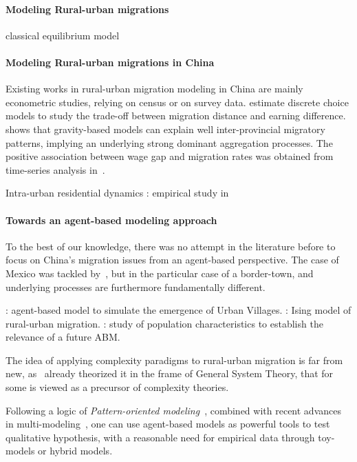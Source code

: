 \paragraph{Modeling Rural-urban migrations}

\cite{todaro1969model} classical equilibrium model


\paragraph{Modeling Rural-urban migrations in China}

Existing works in rural-urban migration modeling in China are mainly econometric studies, relying on census or on survey data. \cite{zhang2013measuring} estimate discrete choice models to study the trade-off between migration distance and earning difference. \cite{fan2005modeling} shows that gravity-based models can explain well inter-provincial migratory patterns, implying an underlying strong dominant aggregation processes. The positive association between wage gap and migration rates was obtained from time-series analysis in~\cite{zhang2003rural}.

Intra-urban residential dynamics : empirical study in \cite{wu2006migrant} 

\paragraph{Towards an agent-based modeling approach}

To the best of our knowledge, there was no attempt in the literature before to focus on China's migration issues from an agent-based perspective. The case of Mexico was tackled by~\cite{de2007netlogo}, but in the particular case of a border-town, and underlying processes are furthermore fundamentally different.

\cite{xie2007simulating} : agent-based model to simulate the emergence of Urban Villages. \cite{silveira2006agent} : Ising model of rural-urban migration. \cite{fernandez2005characterizing} : study of population characteristics to establish the relevance of a future ABM.

The idea of applying complexity paradigms to rural-urban migration is far from new, as~\cite{mabogunje1970systems} already theorized it in the frame of General System Theory, that for some is viewed as a precursor of complexity theories.

Following a logic of \emph{Pattern-oriented modeling}~\cite{grimm2005pattern}, combined with recent advances in multi-modeling~\cite{cottineau2016back}, one can use agent-based models as powerful tools to test qualitative hypothesis, with a reasonable need for empirical data through toy-models or hybrid models.



